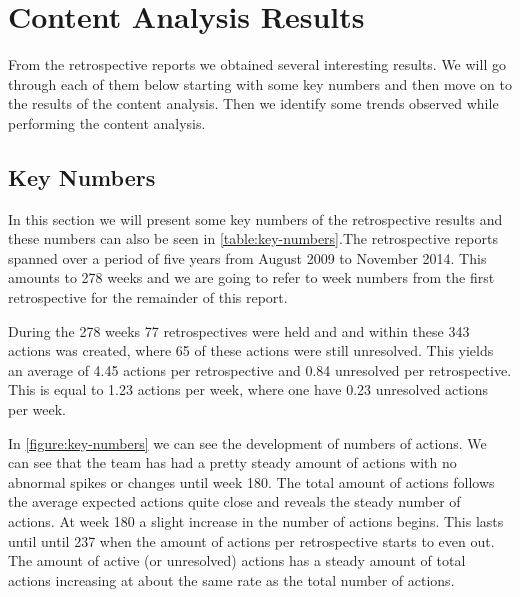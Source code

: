 \clearpage

\section{Content Analysis Results}
From the retrospective reports we obtained several interesting results. We will go through each of them below starting with some key numbers and then move on to the results of the content analysis. Then we identify some trends observed while performing the content analysis. 

\subsection{Key Numbers}
In this section we will present some key numbers of the retrospective results and these numbers can also be seen in \autoref{table:key-numbers}.The retrospective reports spanned over a period of five years from August 2009 to November 2014. This amounts to 278 weeks and we are going to refer to week numbers from the first retrospective for the remainder of this report. 
\begin{table}[!h]
	\begin{center}
	\caption{Some key numbers from the retrospectives}
	\label{table:key-numbers}
\end{center}
\end{table}
During the 278 weeks 77 retrospectives were held and and within these 343 actions was created, where 65 of these actions were still unresolved. This yields an average of 4.45 actions per retrospective and 0.84 unresolved per retrospective. This is equal to 1.23 actions per week, where one have 0.23 unresolved actions per week. 

In \autoref{figure:key-numbers} we can see the development of numbers of actions. We can see that the team has had a pretty steady amount of actions with no abnormal spikes or changes until week 180. The total amount of actions follows the average expected actions quite close and reveals the steady number of actions.
At week 180 a slight increase in the number of actions begins. This lasts until until 237 when the amount of actions per retrospective starts to even out. 
The amount of active (or unresolved) actions has a steady amount of total actions increasing at about the same rate as the total number of actions. 


